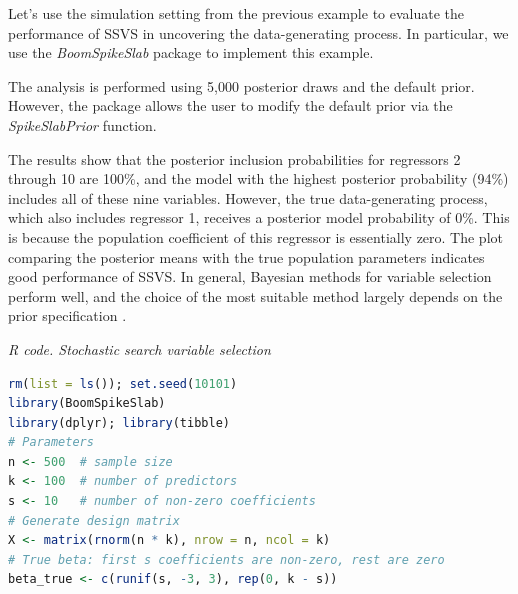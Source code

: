 Let's use the simulation setting from the previous example to evaluate the performance of SSVS in uncovering the data-generating process. In particular, we use the \textit{BoomSpikeSlab} package to implement this example.

The analysis is performed using 5,000 posterior draws and the default prior. However, the package allows the user to modify the default prior via the \textit{SpikeSlabPrior} function.

The results show that the posterior inclusion probabilities for regressors 2 through 10 are 100\%, and the model with the highest posterior probability (94\%) includes all of these nine variables. However, the true data-generating process, which also includes regressor 1, receives a posterior model probability of 0\%. This is because the population coefficient of this regressor is essentially zero. The plot comparing the posterior means with the true population parameters indicates good performance of SSVS. In general, Bayesian methods for variable selection perform well, and the choice of the most suitable method largely depends on the prior specification \cite{ohara2009bayesian}.

\begin{tcolorbox}[enhanced,width=4.67in,center upper,
	fontupper=\large\bfseries,drop shadow southwest,sharp corners]
	\textit{R code. Stochastic search variable selection}
	\begin{VF}
		\begin{lstlisting}[language=R]
rm(list = ls()); set.seed(10101)
library(BoomSpikeSlab)
library(dplyr); library(tibble)
# Parameters
n <- 500  # sample size
k <- 100  # number of predictors
s <- 10   # number of non-zero coefficients
# Generate design matrix
X <- matrix(rnorm(n * k), nrow = n, ncol = k)
# True beta: first s coefficients are non-zero, rest are zero
beta_true <- c(runif(s, -3, 3), rep(0, k - s))
\end{lstlisting}
	\end{VF}
\end{tcolorbox}

